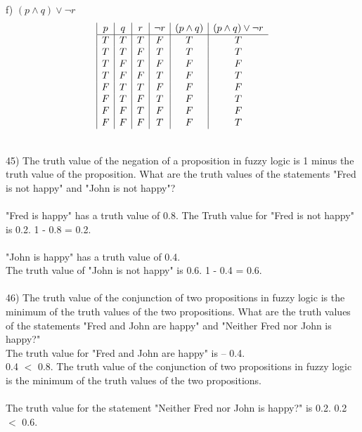 \documentclass{article}
\begin{document}
\begin{flushleft}
~\\~\\\setlength\parindent{24pt}f) $(p \land q) \lor \neg r$ \\ 
\begin{displaymath}
\begin{array}{| c | c | c | c | c | c}
$$p$$
& $$q$$
& $$r$$
& $$\neg r$$
& $$(p \land q)$$
& $$(p \land q) \lor \neg r$$ \\ \hline
T & T & T & F & T & T \\ 
T & T & F & T & T & T \\
T & F & T & F & F & F \\
T & F & F & T & F & T \\
F & T & T & F & F & F \\ 
F & T & F & T & F & T \\
F & F & T & F & F & F \\
F & F & F & T & F & T \\
\end{array}
\end{displaymath}

~\\\setlength\parindent{0pt}45) The truth value of the negation of a proposition in fuzzy logic is 1 minus the truth value of the proposition.  What are the truth values of the statements "Fred is not happy" and "John is not happy"?\\

~\\"Fred is happy" has a truth value of 0.8.  
The Truth value for "Fred is not happy" is 0.2.  1 - 0.8 = 0.2.\\

~\\"John is happy" has a truth value of 0.4.   \\
The truth value of "John is not happy" is 0.6.  1 - 0.4 = 0.6.\\

~\\\setlength\parindent{0pt}46) The truth value of the conjunction of two propositions in fuzzy logic is the minimum of the truth values of the two propositions.  What are the truth values of the statements "Fred and John are happy" and "Neither Fred nor John is happy?"\\

The truth value for "Fred and John are happy" is -- 0.4. \\
0.4 $<$ 0.8.  The truth value of the conjunction of two propositions in fuzzy logic is the minimum of the truth values of the two propositions. \\ 
~\\The truth value for the statement "Neither Fred nor John is happy?" is 0.2.  0.2 $<$ 0.6.


\end{flushleft}
\end{document}
